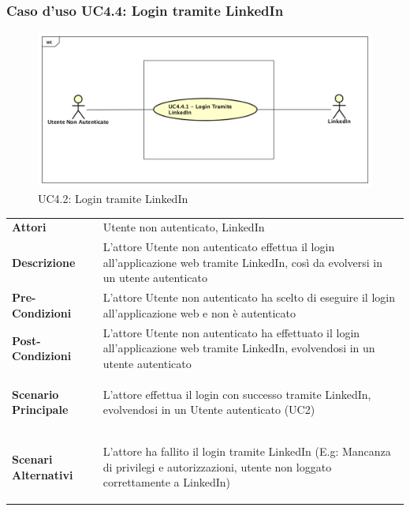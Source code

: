 \newpage
\subsubsection{Caso d'uso UC4.4: Login tramite LinkedIn }
\label{UC4_2}
\begin{figure}[!htbp]
	\centering
	\includegraphics[scale=0.45]{UML/UC4_4.png}
	\caption{UC4.2: Login tramite LinkedIn}
\end{figure}

\begin{tabular}{ l | p{11cm}}
	\hline
	\rowcolor{Gray}
	\multicolumn{2}{c}{UC4.4 - Login tramite LinkedIn} \\
	\hline
	\textbf{Attori} & Utente non autenticato, LinkedIn \\
	\textbf{Descrizione} & L'attore Utente non autenticato effettua il login all'applicazione web tramite LinkedIn, così da evolversi in un utente autenticato\\
	\textbf{Pre-Condizioni} & L'attore Utente non autenticato ha scelto di eseguire il login all'applicazione web e non è autenticato \\
	\textbf{Post-Condizioni} & L'attore Utente non autenticato ha effettuato il login all'applicazione web tramite LinkedIn, evolvendosi in un utente autenticato \\
	\textbf{Scenario Principale} & \begin{enumerate*}[label=(\arabic*.),itemjoin={\newline}]
		\item L'attore effettua il login con successo tramite LinkedIn, evolvendosi in un Utente autenticato (UC2)
	\end{enumerate*}\\
	\textbf{Scenari Alternativi} & \begin{enumerate*}[label=(\arabic*.),itemjoin={\newline}]
		\item L'attore ha fallito il login tramite LinkedIn (E.g: Mancanza di privilegi e autorizzazioni, utente non loggato correttamente a LinkedIn)
	\end{enumerate*}\\
\end{tabular}